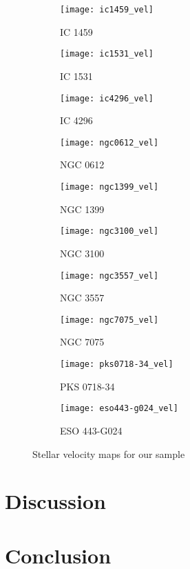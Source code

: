 \documentclass[a4paper,fleqn,usenatbib,useAMS]{mnras}
\begin{document}
	\begin{figure}
		\centering
		\begin{subfigure}{0.23\textwidth}
			\centering
			\texttt{[image: ic1459\_vel]}
			\caption{IC 1459}
			\label{subfig:ic1459}
		\end{subfigure}
		\begin{subfigure}{0.23\textwidth}
			\centering
			\texttt{[image: ic1531\_vel]}
			\caption{IC 1531}
			\label{subfig:ic1531}
		\end{subfigure}
		\begin{subfigure}{0.23\textwidth}
			\centering
			\texttt{[image: ic4296\_vel]}
			\caption{IC 4296}
			\label{subfig:ic4296}
		\end{subfigure}
		\begin{subfigure}{0.23\textwidth}
			\centering
			\texttt{[image: ngc0612\_vel]}
			\caption{NGC 0612}
			\label{subfig:ngc0612}
		\end{subfigure}
		\begin{subfigure}{0.23\textwidth}
			\centering
			\texttt{[image: ngc1399\_vel]}
			\caption{NGC 1399}
			\label{subfig:ngc1399}
		\end{subfigure}
		\begin{subfigure}{0.23\textwidth}
			\centering
			\texttt{[image: ngc3100\_vel]}
			\caption{NGC 3100}
			\label{subfig:ngc3100}
		\end{subfigure}
		\begin{subfigure}{0.23\textwidth}
			\centering
			\texttt{[image: ngc3557\_vel]}
			\caption{NGC 3557}
			\label{subfig:ngc3557}
		\end{subfigure}
		\begin{subfigure}{0.23\textwidth}
			\centering
			\texttt{[image: ngc7075\_vel]}
			\caption{NGC 7075}
			\label{subfig:ngc7075}
		\end{subfigure}
		\begin{subfigure}{0.23\textwidth}
			\centering
			\texttt{[image: pks0718-34\_vel]}
			\caption{PKS 0718-34}
			\label{subfig:pks0718-34}
		\end{subfigure}
		\begin{subfigure}{0.23\textwidth}
			\centering
			\texttt{[image: eso443-g024\_vel]}
			\caption{ESO 443-G024}
			\label{subfig:eso443-g024}
		\end{subfigure}
		\caption{Stellar velocity maps for our sample}
		\label{fig:velmaps}
	\end{figure}


\section{Discussion}
	\label{sec:discuss}

\section{Conclusion}
	\label{sec:conc}


\floatbarrier


{}
\end{document}
